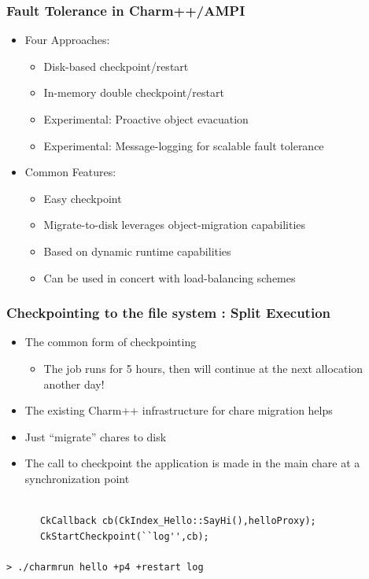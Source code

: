 \begin{frame}[fragile]

  \frametitle{Fault Tolerance in Charm++/AMPI}

  \begin{itemize}
    \item Four Approaches:

      \begin{itemize}
\item Disk-based checkpoint/restart
\item In-memory double checkpoint/restart
\item Experimental: Proactive object evacuation
\item Experimental: Message-logging for scalable fault tolerance
      \end{itemize}
    \item Common Features:
\begin{itemize}
\item Easy checkpoint 
\item Migrate-to-disk leverages object-migration capabilities
\item Based on dynamic runtime capabilities
\item Can be used in concert with load-balancing schemes
     \end{itemize}
  \end{itemize}
\end{frame}

\begin{frame}[fragile]
  \frametitle{Checkpointing to the file system : Split Execution}
\begin{itemize}
\item The common form of checkpointing
\begin{itemize}
\item The job runs for 5 hours, then will continue at the next
  allocation another day! 
\end{itemize}

\item The existing Charm++ infrastructure for chare migration helps
\item Just ``migrate'' chares to disk
\item The call to checkpoint the application is made in the main chare at a synchronization point
\end{itemize}

 \begin{lstlisting}[basicstyle=\footnotesize]

      CkCallback cb(CkIndex_Hello::SayHi(),helloProxy);
      CkStartCheckpoint(``log'',cb);

> ./charmrun hello +p4 +restart log

\end{lstlisting}

\end{frame}


